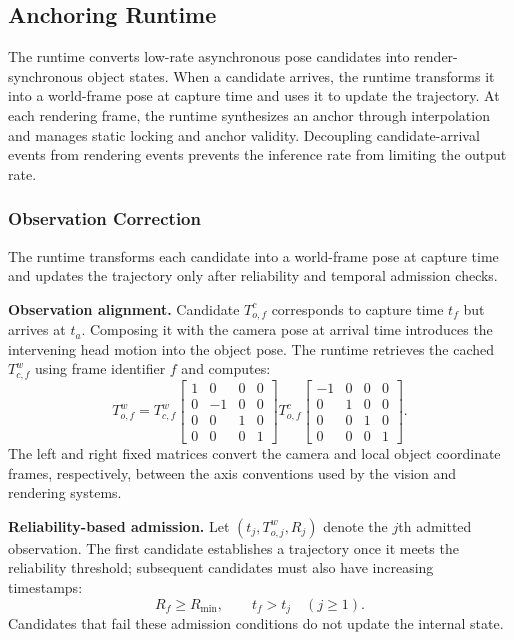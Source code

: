 \documentclass[review]{vgtc}
\begin{document}
\subsection{Anchoring Runtime}\label{sec:anchoring}

The runtime converts low-rate asynchronous pose candidates into render-synchronous object states. When a candidate arrives, the runtime transforms it into a world-frame pose at capture time and uses it to update the trajectory. At each rendering frame, the runtime synthesizes an anchor through interpolation and manages static locking and anchor validity. Decoupling candidate-arrival events from rendering events prevents the inference rate from limiting the output rate.

\subsubsection{Observation Correction}\label{sec:obs-update}

The runtime transforms each candidate into a world-frame pose at capture time and updates the trajectory only after reliability and temporal admission checks.

\textbf{Observation alignment.}
Candidate $T_{o,f}^{c}$ corresponds to capture time $t_f$ but arrives at $t_a$. Composing it with the camera pose at arrival time introduces the intervening head motion into the object pose. The runtime retrieves the cached $T_{c,f}^{w}$ using frame identifier $f$ and computes:
\begin{equation}
T_{o,f}^{w} = T_{c,f}^{w}
\begin{bmatrix}
1 & 0 & 0 & 0 \\
0 & -1 & 0 & 0 \\
0 & 0 & 1 & 0 \\
0 & 0 & 0 & 1
\end{bmatrix}
T_{o,f}^{c}
\begin{bmatrix}
-1 & 0 & 0 & 0 \\
0 & 1 & 0 & 0 \\
0 & 0 & 1 & 0 \\
0 & 0 & 0 & 1
\end{bmatrix}.
\label{eq:capture-alignment}
\end{equation}
The left and right fixed matrices convert the camera and local object coordinate frames, respectively, between the axis conventions used by the vision and rendering systems.

\textbf{Reliability-based admission.}
Let $(t_j,T_{o,j}^{w},R_j)$ denote the $j$th admitted observation. The first candidate establishes a trajectory once it meets the reliability threshold; subsequent candidates must also have increasing timestamps:
\begin{equation}
R_f \geq R_{\min}, \qquad t_f > t_j \quad (j \geq 1).
\label{eq:admission}
\end{equation}
Candidates that fail these admission conditions do not update the internal state.
\end{document}
